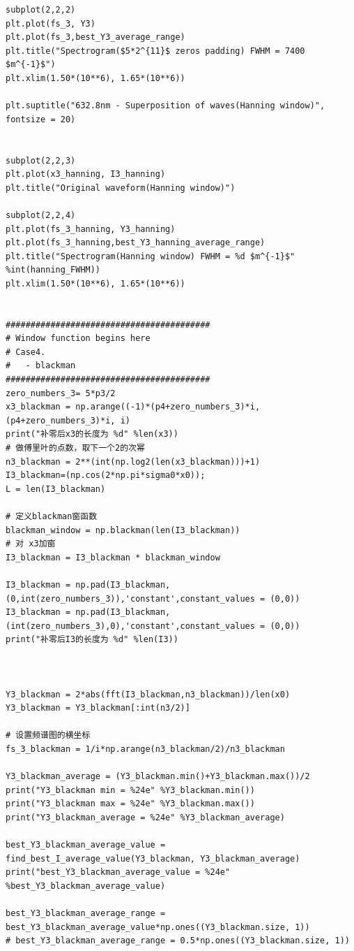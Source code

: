 \documentclass[conference]{IEEEtran}
\begin{document}
\begin{lstlisting}
subplot(2,2,2)
plt.plot(fs_3, Y3)
plt.plot(fs_3,best_Y3_average_range)
plt.title("Spectrogram($5*2^{11}$ zeros padding) FWHM = 7400 $m^{-1}$")
plt.xlim(1.50*(10**6), 1.65*(10**6))

plt.suptitle("632.8nm - Superposition of waves(Hanning window)", fontsize = 20)


subplot(2,2,3)
plt.plot(x3_hanning, I3_hanning)
plt.title("Original waveform(Hanning window)")

subplot(2,2,4)
plt.plot(fs_3_hanning, Y3_hanning)
plt.plot(fs_3_hanning,best_Y3_hanning_average_range)
plt.title("Spectrogram(Hanning window) FWHM = %d $m^{-1}$" %int(hanning_FWHM))
plt.xlim(1.50*(10**6), 1.65*(10**6))


#########################################
# Window function begins here
# Case4.
#   - blackman
#########################################
zero_numbers_3= 5*p3/2
x3_blackman = np.arange((-1)*(p4+zero_numbers_3)*i, (p4+zero_numbers_3)*i, i)
print("补零后x3的长度为 %d" %len(x3)) 
# 做傅里叶的点数，取下一个2的次幂
n3_blackman = 2**(int(np.log2(len(x3_blackman)))+1)
I3_blackman=(np.cos(2*np.pi*sigma0*x0));
L = len(I3_blackman)

# 定义blackman窗函数
blackman_window = np.blackman(len(I3_blackman))
# 对 x3加窗
I3_blackman = I3_blackman * blackman_window

I3_blackman = np.pad(I3_blackman,(0,int(zero_numbers_3)),'constant',constant_values = (0,0))
I3_blackman = np.pad(I3_blackman,(int(zero_numbers_3),0),'constant',constant_values = (0,0))
print("补零后I3的长度为 %d" %len(I3)) 



Y3_blackman = 2*abs(fft(I3_blackman,n3_blackman))/len(x0)
Y3_blackman = Y3_blackman[:int(n3/2)]

# 设置频谱图的横坐标
fs_3_blackman = 1/i*np.arange(n3_blackman/2)/n3_blackman

Y3_blackman_average = (Y3_blackman.min()+Y3_blackman.max())/2
print("Y3_blackman min = %24e" %Y3_blackman.min())
print("Y3_blackman max = %24e" %Y3_blackman.max())
print("Y3_blackman_average = %24e" %Y3_blackman_average)

best_Y3_blackman_average_value = find_best_I_average_value(Y3_blackman, Y3_blackman_average)
print("best_Y3_blackman_average_value = %24e" %best_Y3_blackman_average_value)

best_Y3_blackman_average_range = best_Y3_blackman_average_value*np.ones((Y3_blackman.size, 1))
# best_Y3_blackman_average_range = 0.5*np.ones((Y3_blackman.size, 1))


\end{lstlisting}
\end{document}
